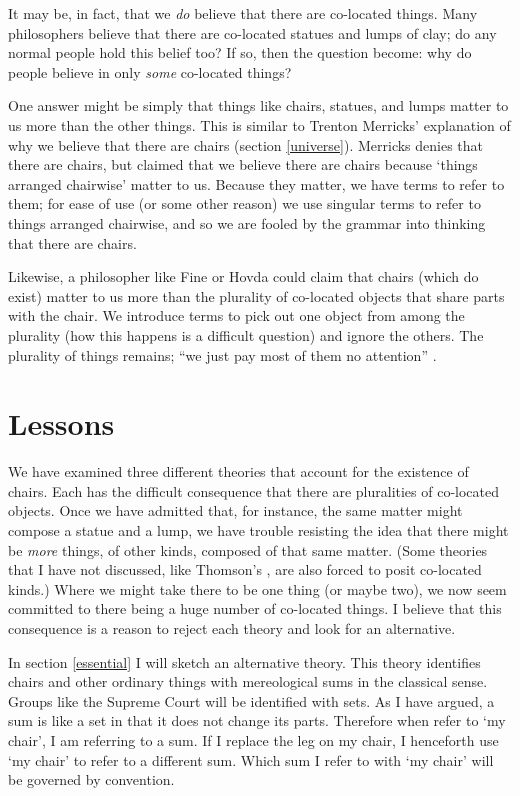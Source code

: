 \documentclass[11pt]{article}
\begin{document}
\begin{spacing}{1.5}
It may be, in fact, that we {\em do} believe that there are co-located
things.  Many philosophers believe that there are co-located statues
and lumps of clay; do any normal people hold this belief too?
If so, then the question become: why do people believe in only {\em
  some} co-located things?

One answer might be simply that things like chairs, statues, and lumps
matter to us more than the other things.  This is similar to Trenton
Merricks' explanation of why we believe that there are chairs (section
\ref{universe}).  Merricks denies that there are chairs, but claimed
that we believe there are chairs because `things arranged chairwise'
matter to us.  Because they matter, we have terms to refer to them;
for ease of use (or some other reason) we use singular terms to refer
to things arranged chairwise, and so we are fooled by the grammar into
thinking that there are chairs.

Likewise, a philosopher like Fine or Hovda could claim that chairs
(which do exist) matter to us more than the plurality of co-located
objects that share parts with the chair.  We introduce terms to pick
out one object from among the plurality (how this happens is a
difficult question) and ignore the others.  The plurality of things
remains; ``we just pay most of them no attention''
\citep[356]{bennett2004}.

\section{Lessons}
\label{lessons-p}
We have examined three different theories that account for the
existence of chairs.  Each has the difficult consequence that there
are pluralities of co-located objects.  Once we have admitted that,
for instance, the same matter might compose a statue and a lump, we
have trouble resisting the idea that there might be {\em more} things,
of other kinds, composed of that same matter.  (Some theories that I
have not discussed, like Thomson's \citeyearpar{thomson1998a}, are
also forced to posit co-located kinds.)  Where we might take there to
be one thing (or maybe two), we now seem committed to there being a
huge number of co-located things.  I believe that this consequence is
a reason to reject each theory and look for an alternative.

In section \ref{essential} I will sketch an alternative theory.  This
theory identifies chairs and other ordinary things with mereological
sums in the classical sense.  Groups like the Supreme Court will be
identified with sets.  As I have argued, a sum is like a set in that
it does not change its parts.  Therefore when refer to `my chair', I
am referring to a sum.  If I replace the leg on my chair, I henceforth
use `my chair' to refer to a different sum.  Which sum I refer to with
`my chair' will be governed by convention.

\ifstandalone
\end{spacing}


\fi
\end{document}

